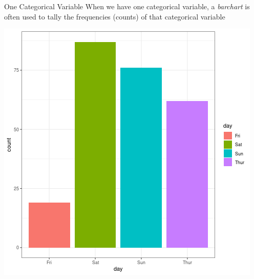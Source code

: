 \documentclass{beamer}
\begin{document}
\begin{frame}{One Categorical Variable}
When we have one categorical variable, a \textit{barchart} is often used to tally the frequencies (counts) of that categorical variable
\begin{center}
\includegraphics[scale=0.35]{img/tip_day.png}
\end{center}
\end{frame}
\end{document}
